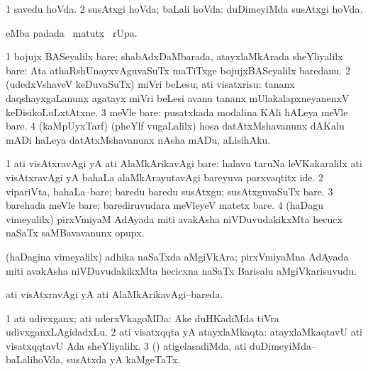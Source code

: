 \bentry
{}
\gl{\gu}
\bmng
\bnum
\num{1} savedu hoVda. 
\num{2} susAtxgi hoVda; baLali hoVda:  duDimeyiMda susAtxgi hoVda. 
\enum
\emng
\eentry

\bentry
{}
\gl{\kirx}
\bmng
{} eMba padada \BU\ matutx \BUkaq\ rUpa. 
\emng
\eentry

\bentry
{}
\gl{\kirx}
\bmng
\bnum
\num{1} bojujx BASeyalilx bare; shabAdxDaMbarada, atayxlaMkArada sheYliyalilx bare:  Ata athaRshUnayxvAguvaSuTx maTiTxge bojujxBASeyalilx baredanu. 
\num{2} (udedxVshaveV keDuvaSuTx) miVri beLesu; ati visatxrisu:  tananx daqshayxgaLanunx agatayx miVri beLesi avanu tananx mUlakalapxneyanenxV keDisikoLuLxtAtxne. 
\num{3} meVle bare:  pusatxkada modalina KAli hALeya meVle bare. 
\num{4} (kaMpUyxTarf) (pheYlf \mo vugaLalilx) hosa datAtxMshavanunx dAKalu mADi haLeya datAtxMshavanunx nAsha mADu, aLisihAku. 
\enum
\emng

\noindent
\gl{\akirx}
\bmng
\bnum
\num{1} ati visAtxravAgi yA ati AlaMkArikavAgi bare:  halavu taruNa leVKakaralilx ati visAtxravAgi yA bahaLa alaMkArayutavAgi bareyuva parxvaqtitx ide. 
\num{2} vipariVta, bahaLa--bare; baredu baredu susAtxgu; susAtxguvaSuTx bare. 
\num{3} barehada meVle bare; barediruvudara meVleyeV matetx bare. 
\num{4} (haDagu vimeyalilx) pirxVmiyaM AdAyada miti avakAsha niVDuvudakikxMta hecucx naSaTx saMBavavanunx opupx. 
\enum
\emng
\eentry

\bentry
{}
\gl{\nA}
\bmng
(haDagina vimeyalilx) adhika naSaTxda aMgiVkAra; pirxVmiyaMna AdAyada miti avakAsha niVDuvudakikxMta hecicxna naSaTx Barisalu aMgiVkarisuvudu. 
\emng
\eentry

\bentry
{}
\gl{\gu}
\bmng
ati visAtxravAgi yA ati AlaMkArikavAgi--bareda. 
\emng
\eentry

\bentry
{}
\gl{\gu}
\bmng
\bnum
\num{1} ati udivxganx; ati uderxVkagoMDa:  Ake duHKadiMda tiVra udivxganxLAgidadxLu. 
\num{2} ati visatxqqta yA atayxlaMkaqta:  atayxlaMkaqtavU ati visatxqqtavU Ada sheYliyalilx. 
\num{3} (\pArxparx) atigelasadiMda, ati duDimeyiMda--baLalihoVda, susAtxda yA kaMgeTaTx. 
\enum
\emng
\eentry

